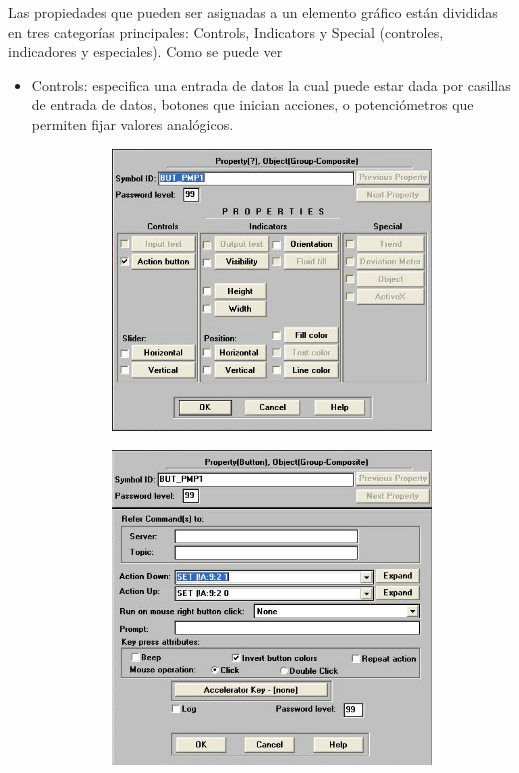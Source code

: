 Las propiedades que pueden ser asignadas a un elemento gráfico están divididas 
en tres categorías principales: Controls, Indicators y Special (controles, 
indicadores y especiales). Como se puede ver 
\begin{itemize}
\item  Controls: especifica una entrada de datos la cual puede estar dada por 
	casillas de entrada de datos, botones que inician acciones, o
	potenciómetros que permiten fijar valores analógicos.
	
	
  \begin{figure}[!ht]
	\centering
	\begin{subfigure}[b]{0.2\textwidth}
	    \includegraphics[width=\textwidth]{Cap5-SCADA/images/actbtn.jpeg}
	    \caption{}
	    \label{}
  	\end{subfigure}
	\begin{subfigure}[b]{0.2\textwidth}
	    \includegraphics[width=\textwidth]{Cap5-SCADA/images/actbtn1.jpeg}

\end{subfigure}
\end{figure}
\end{itemize}

